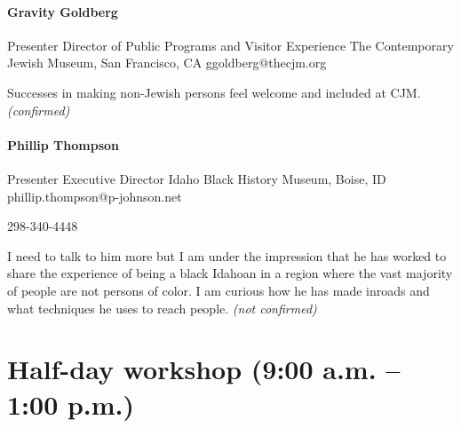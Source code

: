 \documentclass{report}
\begin{document}
              

              
                \subsubsection*{ Gravity Goldberg }
                Presenter\newline
                Director of Public Programs and Visitor Experience\newline
                The Contemporary Jewish Museum, San Francisco, CA
                \newline
                ggoldberg@thecjm.org\newline
                
                

                Successes in making non-Jewish persons feel welcome and included at CJM.
                \emph{ (confirmed) }
              

              
                \subsubsection*{ Phillip Thompson }
                Presenter\newline
                Executive Director\newline
                Idaho Black History Museum, Boise, ID
                \newline
                phillip.thompson@p-johnson.net\newline
                
                298-340-4448\newline

                I need to talk to him more but I am under the impression that he has worked to share the experience of being a black Idahoan in a region where the vast majority of people are not persons of color. I am curious how he has made inroads and what techniques he uses to reach people.
                \emph{ (not confirmed) }
              

              

              
    \newpage
    \chapter*{ Half-day workshop (9:00 a.m. – 1:00 p.m.) }

      
        
\end{document}
